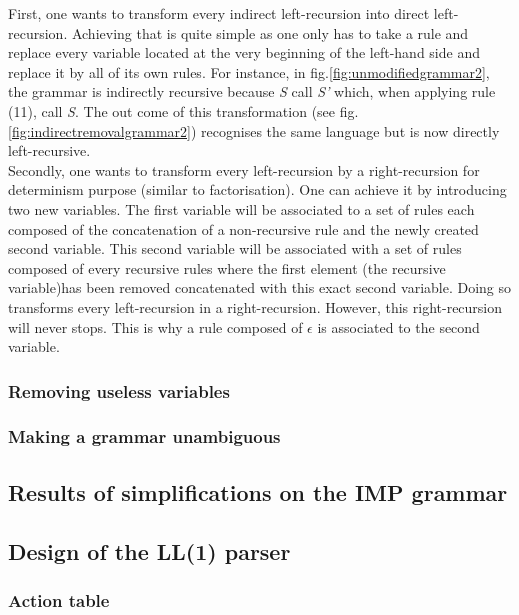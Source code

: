 \documentclass[a4paper,11pt]{article}
\begin{document}
      First, one wants to transform every indirect left-recursion into direct left-recursion. Achieving that is quite simple as one only has to take a rule and replace every variable located at the very beginning of the left-hand side and replace it by all of its own rules. For instance, in fig.\ref{fig:unmodifiedgrammar2}, the grammar is indirectly recursive because \textit{S} call \textit{S'} which, when applying rule (11), call \textit{S}. The out come of this transformation (see fig.\ref{fig:indirectremovalgrammar2}) recognises the same language but is now directly left-recursive.\\
      Secondly, one wants to transform every left-recursion by a right-recursion for determinism purpose (similar to factorisation). One can achieve it by introducing two new variables. The first variable will be associated to a set of rules each composed of the concatenation of a non-recursive rule and the newly created second variable. This second variable will be associated with a set of rules composed of every recursive rules where the first element (the recursive variable)has been removed concatenated with this exact second variable. Doing so transforms every left-recursion in a right-recursion. However, this right-recursion will never stops. This is why a rule composed of $\epsilon$ is associated to the second variable. %
      
      \subsubsection{Removing useless variables}
        
      \subsubsection{Making a grammar unambiguous}
  
  \subsection{Results of simplifications on the IMP grammar}
    
  \subsection{Design of the LL(1) parser}
  
    \subsubsection{Action table}
      
\end{document}
